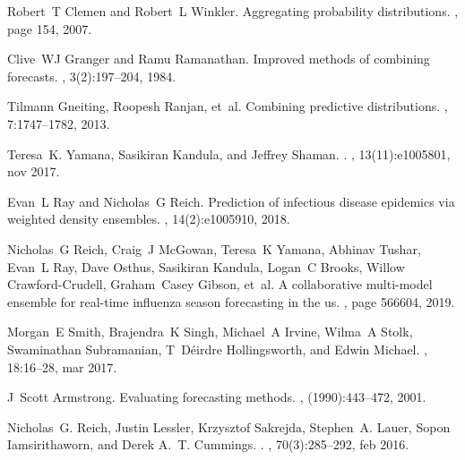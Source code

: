 \documentclass[a4paper]{article}
\begin{document}
\begin{thebibliography}{100}
Robert~T Clemen and Robert~L Winkler.
\newblock Aggregating probability distributions.
, page 154, 2007.

Clive~WJ Granger and Ramu Ramanathan.
\newblock Improved methods of combining forecasts.
, 3(2):197--204, 1984.

Tilmann Gneiting, Roopesh Ranjan, et~al.
\newblock Combining predictive distributions.
, 7:1747--1782, 2013.

Teresa~K. Yamana, Sasikiran Kandula, and Jeffrey Shaman.
.
, 13(11):e1005801, nov 2017.

Evan~L Ray and Nicholas~G Reich.
\newblock Prediction of infectious disease epidemics via weighted density
  ensembles.
, 14(2):e1005910, 2018.

Nicholas~G Reich, Craig~J McGowan, Teresa~K Yamana, Abhinav Tushar, Evan~L Ray,
  Dave Osthus, Sasikiran Kandula, Logan~C Brooks, Willow Crawford-Crudell,
  Graham~Casey Gibson, et~al.
\newblock A collaborative multi-model ensemble for real-time influenza season
  forecasting in the us.
, page 566604, 2019.

Morgan~E Smith, Brajendra~K Singh, Michael~A Irvine, Wilma~A Stolk, Swaminathan
  Subramanian, T~D{\'{e}}irdre Hollingsworth, and Edwin Michael.
, 18:16--28, mar 2017.

J~Scott Armstrong.
\newblock Evaluating forecasting methods.
, (1990):443--472, 2001.

Nicholas~G. Reich, Justin Lessler, Krzysztof Sakrejda, Stephen~A. Lauer, Sopon
  Iamsirithaworn, and Derek A.~T. Cummings.
.
, 70(3):285--292, feb 2016.


\end{thebibliography}
\end{document}
